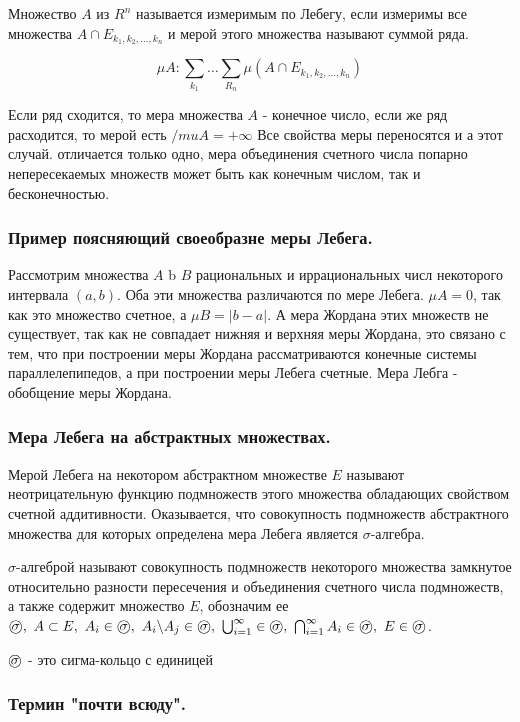 \documentclass[14pt,a4paper]{extarticle}
\theoremstyle{definition}
\theoremstyle{remark}
\renewcommand{\[}{\begin{dmath*}[compact]}
\renewcommand{\]}{\end{dmath*}}
\newcommand{\sep}{ , \ \allowbreak }
\newcommand{\sigmalgebra}{\text{\textcircled{$\sigma$}}}
\begin{document}
Множество $A$ из $R^n$ называется измеримым по Лебегу, если измеримы все множества $A \cap E_{k_1,k_2,\dots,k_n}$ и мерой этого множества называют суммой ряда.

\[\mu A: \sum_{k_1} \dots \sum_{R_n} \mu (A \cap E_{k_1,k_2,\dots,k_n})\]

Если ряд сходится, то мера множества $A$ - конечное число, если же ряд расходится, то мерой есть $/mu A = + \infty$ Все свойства меры переносятся и а этот случай. отличается только одно, мера объединения счетного числа попарно непересекаемых множеств может быть как конечным числом, так и бесконечностью.

\subsubsection{Пример поясняющий своеобразне меры Лебега.}

Рассмотрим множества $A$ b $B$ рациональных и иррациональных числ некоторого интервала $(a,b)$. Оба эти множества различаются по мере Лебега. $\mu A = 0$, так как это множество счетное, а $\mu B = |b-a|$. А мера Жордана этих множеств не существует, так как не совпадает нижняя и верхняя меры Жордана, это связано с тем, что при построении меры Жордана рассматриваются конечные системы параллелепипедов, а при построении меры Лебега счетные. Мера Лебга - обобщение меры Жордана.

\subsubsection{Мера Лебега на абстрактных множествах.}

Мерой Лебега на некотором абстрактном множестве $E$ называют неотрицательную функцию подмножеств этого множества обладающих свойством счетной аддитивности. Оказывается, что совокупность подмножеств абстрактного множества для которых определена мера Лебега является $\sigma$-алгебра.

$\sigma$-алгеброй называют совокупность подмножеств некоторого множества
замкнутое относительно разности пересечения и объединения счетного числа
подмножеств, а также содержит множество $E$, обозначим ее
$ \sigmalgebra \sep A \subset E \sep A_i \in \sigmalgebra \sep
{A_i \backslash A_j \in \sigmalgebra} \sep
\bigcup _ {i=1}^\infty \in \sigmalgebra \sep
\bigcap _ {i=1}^\infty A_i \in \sigmalgebra \sep {E \in \sigmalgebra}$.

$\sigmalgebra$ - это сигма-кольцо с единицей

\subsubsection{Термин "почти всюду".}
\end{document}
